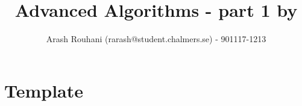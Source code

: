 \documentclass[a4paper,11pt]{article}
\title{Advanced Algorithms - part 1 by}
\author{Arash Rouhani (rarash@student.chalmers.se) - 901117-1213}
\begin{document}
\maketitle

\section{Template}
\end{document}
